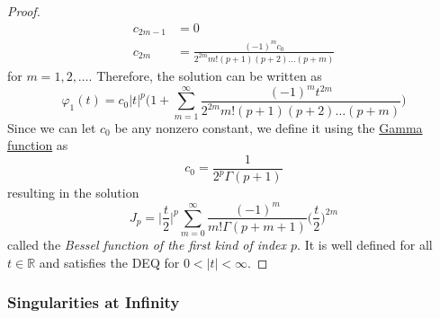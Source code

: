\documentclass{article}
\begin{document}
\begin{proof}
\begin{align*}
          c_{2m-1} & = 0 \\
          c_{2m} & = \frac{(-1)^m c_0}{2^{2m} m! (p+1)(p+2) \ldots (p+m)} 
      \end{align*}
      for $m = 1, 2, \ldots$. Therefore, the solution can be written as
      \begin{equation}
        \varphi_1 (t) = c_0 |t|^p \Bigg( 1 + \sum_{m=1}^\infty \frac{(-1)^m t^{2m}}{2^{2m} m! (p+1) (p+2) \ldots (p+m)} \Bigg)
      \end{equation}
      Since we can let $c_0$ be any nonzero constant, we define it using the \hyperref[def:gamma-function]{Gamma function} as
      \begin{equation}
        c_0 = \frac{1}{2^p \Gamma(p+1)}
      \end{equation}
      resulting in the solution
      \begin{equation}
        J_p = \bigg| \frac{t}{2}\bigg|^p \sum_{m=0}^\infty \frac{(-1)^m}{m! \Gamma(p+m+1)} \bigg(\frac{t}{2}\bigg)^{2m}
      \end{equation}
      called the \textit{Bessel function of the first kind of index $p$}. It is well defined for all $t \in \mathbb{R}$ and satisfies the DEQ for $0 < |t| < \infty$. 
      \end{proof}

    \subsubsection{Singularities at Infinity}
\end{document}
